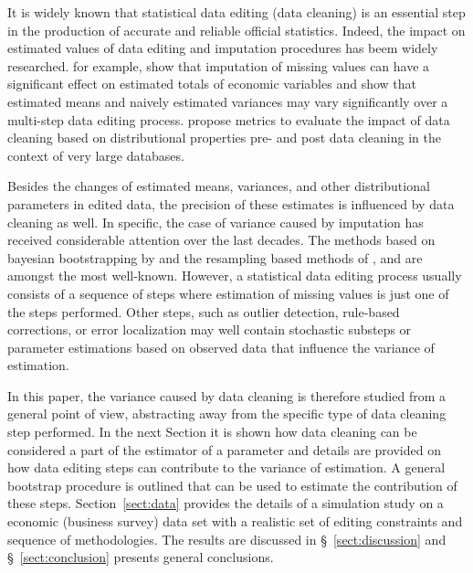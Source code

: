
It is widely known that statistical data editing (data cleaning) is an
essential step in the production of accurate and reliable official statistics.
Indeed, the impact on estimated values of data editing and imputation
procedures has beem widely researched. \citet{whitridge2006impact} for example,
show that imputation of missing values can have a significant effect on
estimated totals of economic variables and \cite{loo2014towards} show that
estimated means and naively estimated variances may vary significantly over a
multi-step data editing process. \cite{dasu2012statistical} propose metrics to
evaluate the impact of data cleaning based on distributional properties pre-
and post data cleaning in the context of very large databases.

Besides the changes of estimated means, variances, and other distributional
parameters in edited data, the precision of these estimates is influenced by
data cleaning as well. In specific, the case of variance caused by imputation
has received considerable attention over the last decades. The methods based on
bayesian bootstrapping by \cite{rubin1987multiple,rubin1996multiple} and the
resampling based methods of \cite{rao1992jackknife,rao1996variance}, and
\citet{shao1996bootstrap}  \cite{shao2002sample,shao2008confidence} are amongst
the most well-known. However, a statistical data editing process usually
consists of a sequence of steps where estimation of missing values is just one
of the steps performed.  Other steps, such as outlier detection, rule-based
corrections, or error localization may well contain stochastic substeps or
parameter estimations based on observed data that influence the variance of
estimation.

In this paper, the variance caused by data cleaning is therefore studied from a
general point of view, abstracting away from the specific type of data cleaning
step performed. In the next Section it is shown how data cleaning can be
considered a part of the estimator of a parameter and details are provided on
how data editing steps can contribute to the variance of estimation. A general
bootstrap procedure is outlined that can be used to estimate the contribution
of these steps.  Section~\ref{sect:data} provides the details of a simulation
study on a economic (business survey) data set with a realistic set of editing
constraints and sequence of methodologies. The results are discussed in
\S~\ref{sect:discussion} and \S~\ref{sect:conclusion} presents
general conclusions.












